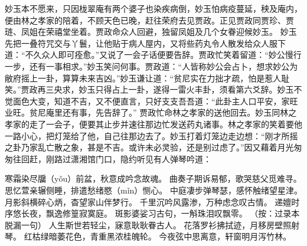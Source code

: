 \documentclass[12pt,oneside]{book}
\begin{document}
妙玉本不愿来，只因栊翠庵有两个婆子也染疾病倒，妙玉怕病疫蔓延，秧及庵内，便由林之孝家的陪着，不顾天色已晚，赶往荣府去见贾政。正见贾政同贾珍、贾琏、凤姐在荣禧堂坐着。贾政命众人回避，独留凤姐及几个女眷迎候妙玉。
妙玉先把一叠符咒交与丫鬟，让他贴于病人屋内，又将些药丸令人散发给众人服下道：“不久众人即可痊愈。”又说了一会子话便要告辞。贾政忙笑着留道：“妙公慢行一步，还有一事相求。”妙玉笑问何事。贾政道：“人皆称妙公会占卜，想求妙公为敝府摇上一卦，算算未来吉凶。”妙玉谦让道：“贫尼实在力拙才疏，怕是惹人耻笑。”贾政再三央求，妙玉只得占上一卦，遂得一雷火丰卦，须看第六爻辞。妙玉不觉面色大变，知道不吉，又不便直言，只好支支吾吾道：“此卦主人口平安，家旺业旺。贫尼庵里还有事，先告辞了。”
贾政忙命林之孝家的送他回去。妙玉同林之孝家的走了一会子，便要其止步并速往那边忙发送药丸诸事。林之孝家的笑着要他一路小心，把灯笼给了他，自己往那边去了。妙玉打着灯笼边走边想：“刚才所摇之卦乃家乱亡散之象，甚是不吉。或许未必灵验，还是别过虑了。”因又藉着月光匆匆往回赶，刚路过潇湘馆门口，隐约听见有人弹琴吟道：

寒霜染尽牖（yǒu）前盆，秋意成吟念故魂。
曲奏子期诉易郁，歌哭慈父觅难寻。
思忆萱亲辗侧睡，排遣愁绪愍（mǐn）恻心。
中庭凄步弹琴瑟，感怀触绪望星津。
月影斜横碎心炳，杳望家山伴梦行。
千里沉吟风露渗，万种虑念叹古情。
递嬗时序悠长夜，飘逸修篁寂寞庭。
斑影婆娑习古句，一斛珠泪叹飘零。
（按：过录本脱漏一句）
人生斯世若轻尘，寐意耿耿眷古人。
花落罗衫拂拭迹，月移房壁照射琴。
红枯绿暗萎花色，青重黑浓桂魄轮。
今夜弦中思离意，轩窗明月泻竹林。
\end{document}

